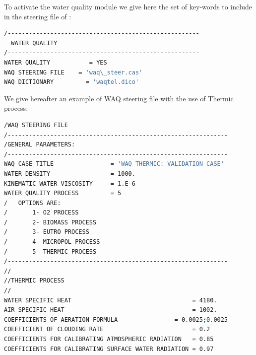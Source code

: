  To activate the water quality module we give here the set of key-words to include in the steering file of :
\begin{lstlisting}[language=bash]
/------------------------------------------------------
  WATER QUALITY
/------------------------------------------------------
WATER QUALITY           = YES
WAQ STEERING FILE    = 'waq\_steer.cas'
WAQ DICTIONARY         = 'waqtel.dico'
\end{lstlisting}
 We give hereafter an example of WAQ steering file with the use of Thermic process:
\begin{lstlisting}[language=bash]
/WAQ STEERING FILE
/--------------------------------------------------------------
/GENERAL PARAMETERS:
/--------------------------------------------------------------
WAQ CASE TITLE                = 'WAQ THERMIC: VALIDATION CASE'
WATER DENSITY                 = 1000.
KINEMATIC WATER VISCOSITY     = 1.E-6
WATER QUALITY PROCESS         = 5
/   OPTIONS ARE:
/       1- O2 PROCESS
/       2- BIOMASS PROCESS
/       3- EUTRO PROCESS
/       4- MICROPOL PROCESS
/       5- THERMIC PROCESS
/--------------------------------------------------------------
//
//THERMIC PROCESS
//
WATER SPECIFIC HEAT                                  = 4180.
AIR SPECIFIC HEAT                                    = 1002.
COEFFICIENTS OF AERATION FORMULA                = 0.0025;0.0025
COEFFICIENT OF CLOUDING RATE                         = 0.2
COEFFICIENTS FOR CALIBRATING ATMOSPHERIC RADIATION   = 0.85
COEFFICIENTS FOR CALIBRATING SURFACE WATER RADIATION = 0.97
\end{lstlisting}
